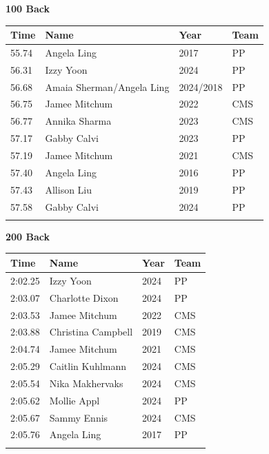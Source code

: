 \vspace{1.2em}
\noindent\begin{minipage}[t]{0.98\textwidth}
\centering
\textbf{\textcolor{teamprimary}{100 Back}}\par
\vspace{0.5em}
\centering
\small
\renewcommand{\arraystretch}{1.0}
\setlength{\tabcolsep}{4pt}
\begin{tabular}{@{}p{2.5cm}p{4.5cm}p{1.5cm}p{2.5cm}@{}}
\toprule
\textbf{Time} & \textbf{Name} & \textbf{Year} & \textbf{Team} \\
\midrule
55.74 & Angela Ling & 2017 & PP \\
56.31 & Izzy Yoon & 2024 & PP \\
56.68 & Amaia Sherman/Angela Ling & 2024/2018 & PP \\
56.75 & Jamee Mitchum & 2022 & CMS \\
56.77 & Annika Sharma & 2023 & CMS \\
57.17 & Gabby Calvi & 2023 & PP \\
57.19 & Jamee Mitchum & 2021 & CMS \\
57.40 & Angela Ling & 2016 & PP \\
57.43 & Allison Liu & 2019 & PP \\
57.58 & Gabby Calvi & 2024 & PP \\
\bottomrule
\vspace{0.5em}
\end{tabular}
\end{minipage}
\vspace{1.2em}
\noindent\begin{minipage}[t]{0.98\textwidth}
\centering
\textbf{\textcolor{teamprimary}{200 Back}}\par
\vspace{0.5em}
\centering
\small
\renewcommand{\arraystretch}{1.0}
\setlength{\tabcolsep}{4pt}
\begin{tabular}{@{}p{2.5cm}p{4.5cm}p{1.5cm}p{2.5cm}@{}}
\toprule
\textbf{Time} & \textbf{Name} & \textbf{Year} & \textbf{Team} \\
\midrule
2:02.25 & Izzy Yoon & 2024 & PP \\
2:03.07 & Charlotte Dixon & 2024 & PP \\
2:03.53 & Jamee Mitchum & 2022 & CMS \\
2:03.88 & Christina Campbell & 2019 & CMS \\
2:04.74 & Jamee Mitchum & 2021 & CMS \\
2:05.29 & Caitlin Kuhlmann & 2024 & CMS \\
2:05.54 & Nika Makhervaks & 2024 & CMS \\
2:05.62 & Mollie Appl & 2024 & PP \\
2:05.67 & Sammy Ennis & 2024 & CMS \\
2:05.76 & Angela Ling & 2017 & PP \\
\bottomrule
\vspace{0.5em}
\end{tabular}
\end{minipage}
